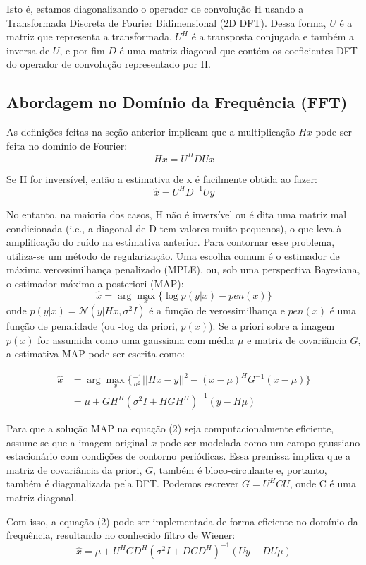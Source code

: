 \documentclass[12pt]{article}
\begin{document}
Isto é, estamos diagonalizando o operador de convolução H usando a Transformada Discreta de Fourier Bidimensional (2D DFT). Dessa forma, $U$ é a matriz que representa a transformada, $U^H$ é a transposta conjugada e também a inversa de $U$, e por fim $D$ é uma matriz diagonal que contém os coeficientes DFT do operador de convolução representado por H.


\subsection{Abordagem no Domínio da Frequência (FFT)}


As definições feitas na seção anterior implicam que a multiplicação $Hx$ pode ser feita no domínio de Fourier:
\[
Hx = U^HDUx
\]

Se H for inversível, então a estimativa de x é facilmente obtida ao fazer:
\[
\hat{x} = U^HD^{-1}Uy
\]

No entanto, na maioria dos casos, H não é inversível ou é dita uma matriz mal condicionada \cite{ozturk2000ill} (i.e., a diagonal de D tem valores muito pequenos), o que leva à amplificação do ruído na estimativa anterior. Para contornar esse problema, utiliza-se um método de regularização. Uma escolha comum é o estimador de máxima verossimilhança penalizado (MPLE), ou, sob uma perspectiva Bayesiana, o estimador máximo a posteriori (MAP):
\[
\hat{x} = \arg \max_{x} \{\log{p(y|x)} - pen(x)\}
\]
onde $p(y|x) = \mathcal{N}(y|Hx, \sigma^2I)$ é a função de verossimilhança e $pen(x)$ é uma função de penalidade (ou -log da priori, $p(x)$). Se a priori sobre a imagem $p(x)$ for assumida como uma gaussiana com média $\mu$ e matriz de covariância $G$, a estimativa MAP pode ser escrita como:

\begin{align}
\hat{x} &= \arg \max_{x} \{\frac{-1}{\sigma^2}||Hx - y||^2 - (x - \mu)^HG^{-1}(x-\mu)  \}\\
        &= \mu + GH^H (\sigma^2I + HGH^H)^{-1} (y-H\mu)   
\end{align}

Para que a solução MAP na equação (2) seja computacionalmente eficiente, assume-se que a imagem original $x$ pode ser modelada como um campo gaussiano estacionário com condições de contorno periódicas. Essa premissa implica que a matriz de covariância da priori, $G$, também é bloco-circulante e, portanto, também é diagonalizada pela DFT. Podemos escrever $G = U^H C U$, onde C é uma matriz diagonal.

Com isso, a equação (2) pode ser implementada de forma eficiente no domínio da frequência, resultando no conhecido filtro de Wiener:
\[
\hat{x} = \mu + U^H C D^H (\sigma^2I + DCD^H)^{-1} (Uy - DU\mu)
\]
\end{document}
